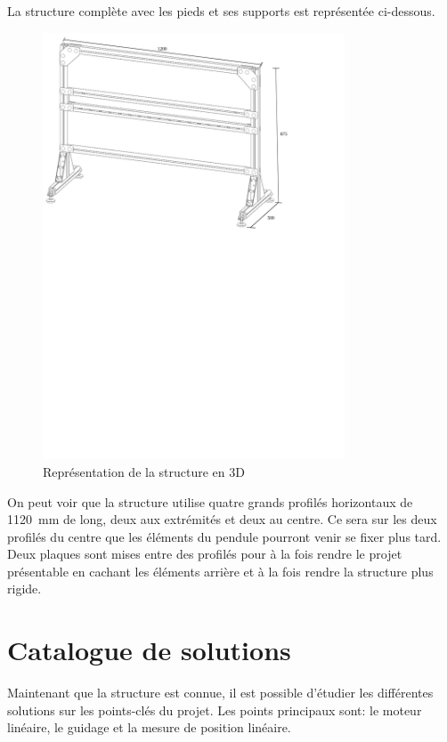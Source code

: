 La structure complète avec les pieds et ses supports est représentée ci-dessous.
\begin{figure}[H]
    \centering
    \includegraphics[width = 0.8\textwidth]{assets/figures/Structure.svg}
    \caption{Représentation de la structure en 3D}
    \label{fig:DescStruct}
\end{figure}

On peut voir que la structure utilise quatre grands profilés horizontaux de 1120~mm de long, deux aux extrémités et deux au centre. Ce sera sur les deux profilés du centre que
les éléments du pendule pourront venir se fixer plus tard. Deux plaques sont mises entre des profilés pour à la fois rendre le projet présentable
en cachant les éléments arrière et à la fois rendre la structure plus rigide.

\section{Catalogue de solutions}\label{sec:CatSol}
Maintenant que la structure est connue, il est possible d'étudier les différentes solutions sur les points-clés du projet.
Les points principaux sont: le moteur linéaire, le guidage et la mesure de position linéaire.\\

